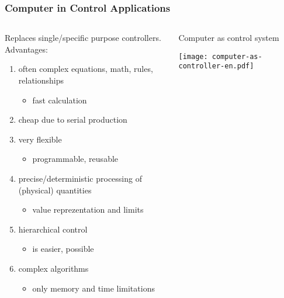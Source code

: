 \documentclass{beamer}
\begin{document}
\begin{frame}
\frametitle{Computer in Control Applications}

\begin{columns}
\begin{column}{0.58\textwidth}
Replaces single/specific purpose controllers. Advantages:
\begin{enumerate}
 \item often complex equations, math, rules, relationships
 \begin{itemize}
  \item fast calculation
 \end{itemize}
 \item cheap due to serial production
 \item very flexible
 \begin{itemize}
  \item programmable, reusable
 \end{itemize}
 \item precise/deterministic processing of (physical) quantities
 \begin{itemize}
  \item value reprezentation and limits
 \end{itemize}
 \item hierarchical control
 \begin{itemize}
  \item is easier, possible
 \end{itemize}
 \item complex algorithms
 \begin{itemize}
  \item only memory and time limitations
 \end{itemize}
\end{enumerate}
  \vfil
\end{column}
\begin{column}{0.42\textwidth}
  \begin{center}
    Computer as control system

    \vspace{5mm}

    \texttt{[image: computer-as-controller-en.pdf]}
  \end{center}
\end{column}
\end{columns}
\end{frame}
\end{document}
